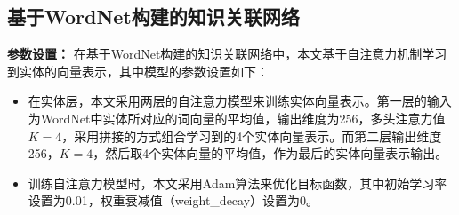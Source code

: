 \subsection{基于WordNet构建的知识关联网络}
\textbf{参数设置：}
在基于WordNet构建的知识关联网络中，本文基于自注意力机制学习到实体的向量表示，其中模型的参数设置如下：
\begin{itemize}
    \item 在实体层，本文采用两层的自注意力模型来训练实体向量表示。第一层的输入为WordNet中实体所对应的词向量的平均值，输出维度为256，多头注意力值$K=4$，采用拼接的方式组合学习到的4个实体向量表示。而第二层输出维度256，$K=4$，然后取4个实体向量的平均值，作为最后的实体向量表示输出。
    \item 训练自注意力模型时，本文采用Adam算法来优化目标函数，其中初始学习率设置为0.01，权重衰减值（weight\_decay）设置为0。
\end{itemize}


